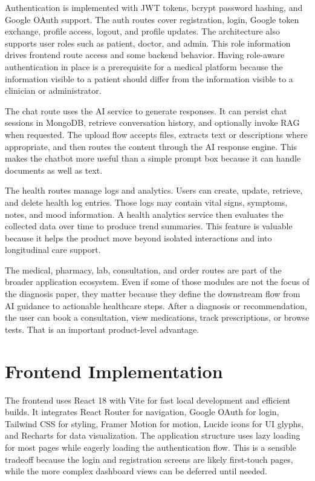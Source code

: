 \documentclass[conference]{IEEEtran}
\begin{document}
Authentication is implemented with JWT tokens, bcrypt password hashing, and Google OAuth support. The auth routes cover registration, login, Google token exchange, profile access, logout, and profile updates. The architecture also supports user roles such as patient, doctor, and admin. This role information drives frontend route access and some backend behavior. Having role-aware authentication in place is a prerequisite for a medical platform because the information visible to a patient should differ from the information visible to a clinician or administrator.

The chat route uses the AI service to generate responses. It can persist chat sessions in MongoDB, retrieve conversation history, and optionally invoke RAG when requested. The upload flow accepts files, extracts text or descriptions where appropriate, and then routes the content through the AI response engine. This makes the chatbot more useful than a simple prompt box because it can handle documents as well as text.

The health routes manage logs and analytics. Users can create, update, retrieve, and delete health log entries. Those logs may contain vital signs, symptoms, notes, and mood information. A health analytics service then evaluates the collected data over time to produce trend summaries. This feature is valuable because it helps the product move beyond isolated interactions and into longitudinal care support.

The medical, pharmacy, lab, consultation, and order routes are part of the broader application ecosystem. Even if some of those modules are not the focus of the diagnosis paper, they matter because they define the downstream flow from AI guidance to actionable healthcare steps. After a diagnosis or recommendation, the user can book a consultation, view medications, track prescriptions, or browse tests. That is an important product-level advantage.

\section{Frontend Implementation}
The frontend uses React 18 with Vite for fast local development and efficient builds. It integrates React Router for navigation, Google OAuth for login, Tailwind CSS for styling, Framer Motion for motion, Lucide icons for UI glyphs, and Recharts for data visualization. The application structure uses lazy loading for most pages while eagerly loading the authentication flow. This is a sensible tradeoff because the login and registration screens are likely first-touch pages, while the more complex dashboard views can be deferred until needed.
\end{document}
